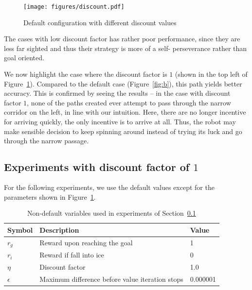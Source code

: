 \documentclass[10pt,a4paper,oneside]{article}
\begin{document}
\begin{figure}
\begin{center}
\texttt{[image: figures/discount.pdf]} 
\end{center}
\caption{Default configuration with different discount values}
\label{fig:discount}
\end{figure}
The cases with low discount factor has rather poor performance, since
they are less far sighted and thus their strategy is more of a self-
perseverance rather than goal oriented.

We now highlight the case where the discount factor is $1$ (shown in the top left of Figure~\ref{fig:discount}). Compared to the default case (Figure~\ref{fig:b}), this path
yields better accuracy. This is confirmed by seeing the results -- in the
case with discount factor $1$, none of the paths created ever attempt to
pass through the narrow corridor on the left, in line with our intuition.
Here, there are no longer incentive for arriving quickly, the only
incentive is to arrive at all. Thus, the robot may make sensible decision
to keep spinning around instead of trying its luck and go through the narrow
passage.

\subsection{Experiments with discount factor of $1$}
\label{s:ideal}

For the following experiments, we use the default values except for the
parameters shown in Figure~\ref{f:idealparam}.

\begin{table}
\begin{center}
\begin{tabular}{|  l | l | l | }
\hline
  \textbf{Symbol} & \textbf{Description} & \textbf{Value} \\ \hline \hline
  $r_g$ & Reward upon reaching the goal & 1 \\ \hline
  $r_i$ & Reward if fall into ice & 0 \\ \hline
  $\eta$ & Discount factor & 1.0 \\ \hline
  $\epsilon$ & Maximum difference before value iteration stops & 0.000001 \\ \hline
\end{tabular}
\end{center}
  \caption{Non-default variables used in experiments of Section~\ref{s:ideal}}
\label{f:idealparam}
\end{table}
\end{document}
